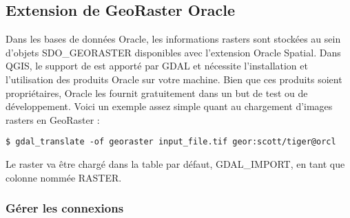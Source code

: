 \subsection{Extension de GeoRaster Oracle}


Dans les bases de données Oracle, les informations rasters sont stockées au sein d'objets SDO\_GEORASTER disponibles avec l'extension Oracle Spatial. Dans QGIS, le support de  est apporté par GDAL et nécessite l'installation et l'utilisation des produits Oracle sur votre machine. Bien que ces produits soient propriétaires, Oracle les fournit gratuitement dans un but de test ou de développement. Voici un exemple assez simple quant au chargement d'images rasters en GeoRaster :

\begin{verbatim} 
$ gdal_translate -of georaster input_file.tif geor:scott/tiger@orcl
\end{verbatim}

Le raster va être chargé dans la table par défaut, GDAL\_IMPORT, en tant que colonne nommée RASTER.

\subsubsection{Gérer les connexions}


